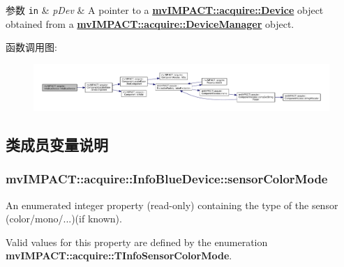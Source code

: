 \begin{DoxyParams}[1]{参数}
\mbox{\tt in}  & {\em p\+Dev} & A pointer to a {\bfseries \hyperlink{classmv_i_m_p_a_c_t_1_1acquire_1_1_device}{mv\+I\+M\+P\+A\+C\+T\+::acquire\+::\+Device}} object obtained from a {\bfseries \hyperlink{classmv_i_m_p_a_c_t_1_1acquire_1_1_device_manager}{mv\+I\+M\+P\+A\+C\+T\+::acquire\+::\+Device\+Manager}} object. \\
\hline
\end{DoxyParams}


函数调用图\+:
\nopagebreak
\begin{figure}[H]
\begin{center}
\leavevmode
\includegraphics[width=350pt]{classmv_i_m_p_a_c_t_1_1acquire_1_1_info_blue_device_a9285bf45e3ecce242611f00eb5d8063f_cgraph}
\end{center}
\end{figure}




\subsection{类成员变量说明}
\hypertarget{classmv_i_m_p_a_c_t_1_1acquire_1_1_info_blue_device_ac6da6693f0d2cc7f9e7b0967382b0aca}{
\subsubsection[{sensor\+Color\+Mode}]{ mv\+I\+M\+P\+A\+C\+T\+::acquire\+::\+Info\+Blue\+Device\+::sensor\+Color\+Mode}}\label{classmv_i_m_p_a_c_t_1_1acquire_1_1_info_blue_device_ac6da6693f0d2cc7f9e7b0967382b0aca}


An enumerated integer property {\bfseries }(read-\/only) containing the type of the sensor (color/mono/...)(if known). 

Valid values for this property are defined by the enumeration {\bfseries mv\+I\+M\+P\+A\+C\+T\+::acquire\+::\+T\+Info\+Sensor\+Color\+Mode}.

